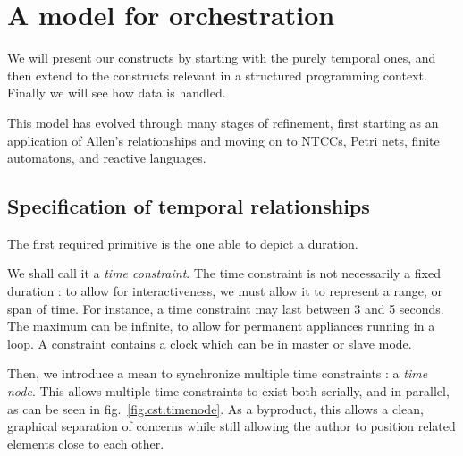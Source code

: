 \documentclass{sigchi}
\begin{document}
\section{A model for orchestration}
We will present our constructs by starting with the purely temporal ones, 
and then extend to the constructs relevant in a structured programming context.
Finally we will see how data is handled.

This model has evolved through many stages of refinement, first starting as an application of 
Allen's relationships and moving on to NTCCs, Petri nets, finite automatons, and reactive languages.

\subsection{Specification of temporal relationships}\label{sec.temporal}
The first required primitive is the one able to depict a duration.

We shall call it a \textit{time constraint}.
The time constraint is not necessarily a fixed duration : to allow for interactiveness, 
we must allow it to represent a range, or span of time. For instance, a time constraint may last between 3 and 5 seconds. The maximum can be infinite, to allow for permanent appliances running in a loop. A constraint contains a clock which can be in master or slave mode.

Then, we introduce a mean to synchronize multiple time constraints : a \textit{time node}. 
This allows multiple time constraints to exist both serially, and in parallel, as can be seen in fig.~\ref{fig.cst.timenode}. 
As a byproduct, this allows a clean, graphical separation of concerns while still allowing the author to position related elements close to each other. %
\end{document}
